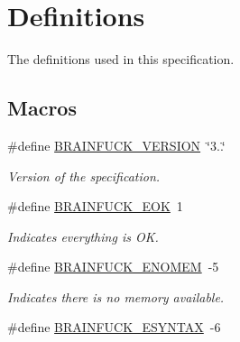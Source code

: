 \hypertarget{group__definitions}{}\section{Definitions}
\label{group__definitions}


The definitions used in this specification.  


\subsection*{Macros}
\begin{DoxyCompactItemize}
\item 
\hypertarget{group__definitions_ga8e98caf5361d8cfd77e3a2021e6be56c}{}\#define \hyperlink{group__definitions_ga8e98caf5361d8cfd77e3a2021e6be56c}{B\+R\+A\+I\+N\+F\+U\+C\+K\+\_\+\+V\+E\+R\+S\+I\+O\+N}~\char`\"{}3..\char`\"{}\label{group__definitions_ga8e98caf5361d8cfd77e3a2021e6be56c}

\begin{DoxyCompactList}\small\item\em Version of the specification. \end{DoxyCompactList}\item 
\hypertarget{group__definitions_ga8bfac4ba16ff2a9367ec92a3b9786599}{}\#define \hyperlink{group__definitions_ga8bfac4ba16ff2a9367ec92a3b9786599}{B\+R\+A\+I\+N\+F\+U\+C\+K\+\_\+\+E\+O\+K}~1\label{group__definitions_ga8bfac4ba16ff2a9367ec92a3b9786599}

\begin{DoxyCompactList}\small\item\em Indicates everything is O\+K. \end{DoxyCompactList}\item 
\hypertarget{group__definitions_gad3390e3ce4ba0b842f667d2dc995d2ac}{}\#define \hyperlink{group__definitions_gad3390e3ce4ba0b842f667d2dc995d2ac}{B\+R\+A\+I\+N\+F\+U\+C\+K\+\_\+\+E\+N\+O\+M\+E\+M}~-\/5\label{group__definitions_gad3390e3ce4ba0b842f667d2dc995d2ac}

\begin{DoxyCompactList}\small\item\em Indicates there is no memory available. \end{DoxyCompactList}\item 
\hypertarget{group__definitions_ga9e705c2052c27e28cf4b7897d6e16505}{}\#define \hyperlink{group__definitions_ga9e705c2052c27e28cf4b7897d6e16505}{B\+R\+A\+I\+N\+F\+U\+C\+K\+\_\+\+E\+S\+Y\+N\+T\+A\+X}~-\/6\label{group__definitions_ga9e705c2052c27e28cf4b7897d6e16505}


\end{DoxyCompactItemize}
